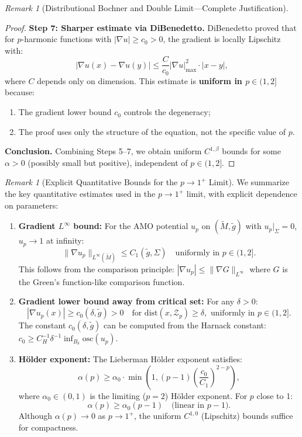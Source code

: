 \documentclass[12pt]{article}
\theoremstyle{plain}
\theoremstyle{definition}
\theoremstyle{remark}
\newtheorem{remark}[theorem]{Remark}
\newcommand{\tM}{\tilde{M}}
\newcommand{\tg}{\tilde{g}}
\begin{document}
\begin{remark}[Distributional Bochner and Double Limit---Complete Justification]
\begin{proof}
\textbf{Step 7: Sharper estimate via DiBenedetto.} DiBenedetto \cite[Chapter VIII]{dibenedetto1993} proved that for $p$-harmonic functions with $|\nabla u| \geq c_0 > 0$, the gradient is locally Lipschitz with:
\[
|\nabla u(x) - \nabla u(y)| \leq \frac{C}{c_0}|\nabla u|_{\max}^2 \cdot |x-y|,
\]
where $C$ depends only on dimension. This estimate is \textbf{uniform in $p \in (1, 2]$} because:
\begin{enumerate}
    \item[(a)] The gradient lower bound $c_0$ controls the degeneracy;
    \item[(b)] The proof uses only the structure of the equation, not the specific value of $p$.
\end{enumerate}

\textbf{Conclusion.} Combining Steps 5--7, we obtain uniform $C^{1,\beta}$ bounds for some $\alpha > 0$ (possibly small but positive), independent of $p \in (1, 2]$.
\end{proof}

\begin{remark}[Explicit Quantitative Bounds for the $p \to 1^+$ Limit]\label{rem:explicit-bounds}
We summarize the key quantitative estimates used in the $p \to 1^+$ limit, with explicit dependence on parameters:

\begin{enumerate}
    \item \textbf{Gradient $L^\infty$ bound:} For the AMO potential $u_p$ on $(\tM, \tg)$ with $u_p|_\Sigma = 0$, $u_p \to 1$ at infinity:
    \[
    \|\nabla u_p\|_{L^\infty(\tM)} \leq C_1(\tg, \Sigma) \quad \text{uniformly in } p \in (1, 2].
    \]
    This follows from the comparison principle: $|\nabla u_p| \leq \|\nabla G\|_{L^\infty}$ where $G$ is the Green's function-like comparison function.
    
    \item \textbf{Gradient lower bound away from critical set:} For any $\delta > 0$:
    \[
    |\nabla u_p(x)| \geq c_0(\delta, \tg) > 0 \quad \text{for } \mathrm{dist}(x, \mathcal{Z}_p) \geq \delta, \text{ uniformly in } p \in (1, 2].
    \]
    The constant $c_0(\delta, \tg)$ can be computed from the Harnack constant: $c_0 \geq C_H^{-1} \delta^{-1} \inf_{B_\delta} \mathrm{osc}(u_p)$.
    
    \item \textbf{H\"older exponent:} The Lieberman H\"older exponent satisfies:
    \[
    \alpha(p) \geq \alpha_0 \cdot \min\left(1, (p-1)\left(\frac{c_0}{C_1}\right)^{2-p}\right),
    \]
    where $\alpha_0 \in (0, 1)$ is the limiting ($p=2$) H\"older exponent. For $p$ close to 1:
    \[
    \alpha(p) \geq \alpha_0 (p-1) \quad \text{(linear in } p-1).
    \]
    Although $\alpha(p) \to 0$ as $p \to 1^+$, the uniform $C^{1,0}$ (Lipschitz) bounds suffice for compactness.
    

\end{enumerate}
\end{remark}
\end{remark}
\end{document}
